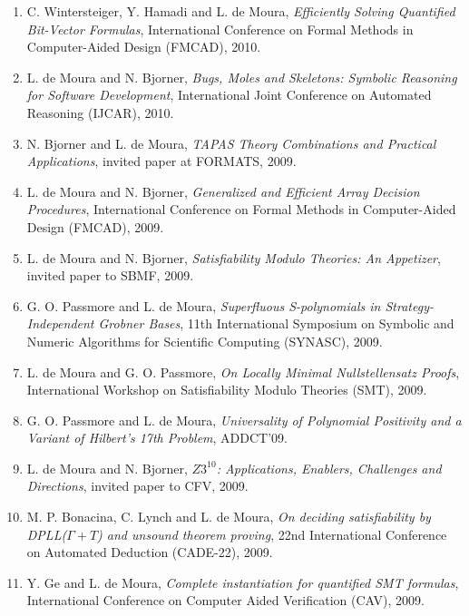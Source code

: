 \documentclass[11pt,a4paper]{article}
\begin{document}
\begin{enumerate}[leftmargin=*,itemsep=0.5ex,topsep=0.6ex]
\item C. Wintersteiger, Y. Hamadi and L. de Moura,
      {\em Efficiently Solving Quantified Bit-Vector Formulas},
      International Conference on Formal Methods in Computer-Aided Design (FMCAD), 2010.

\item L. de Moura and N. Bjorner,
      {\em Bugs, Moles and Skeletons: Symbolic Reasoning for Software Development},
      International Joint Conference on Automated Reasoning (IJCAR), 2010.

\item N. Bjorner and L. de Moura,
      {\em TAPAS Theory Combinations and Practical Applications},
      invited paper at FORMATS, 2009.

\item L. de Moura and N. Bjorner,
      {\em Generalized and Efficient Array Decision Procedures},
      International Conference on Formal Methods in Computer-Aided Design (FMCAD), 2009.

\item L. de Moura and N. Bjorner,
      {\em Satisfiability Modulo Theories: An Appetizer},
      invited paper to SBMF, 2009.

\item G. O. Passmore and L. de Moura,
      {\em Superfluous S-polynomials in Strategy-Independent Grobner Bases},
      11th International Symposium on Symbolic and Numeric Algorithms for Scientific Computing (SYNASC), 2009.

\item L. de Moura and G. O. Passmore,
      {\em On Locally Minimal Nullstellensatz Proofs},
      International Workshop on Satisfiability Modulo Theories (SMT), 2009.

\item G. O. Passmore and L. de Moura,
      {\em Universality of Polynomial Positivity and a Variant of Hilbert's 17th Problem},
      ADDCT'09.

\item L. de Moura and N. Bjorner,
      {\em $Z3^{10}$: Applications, Enablers, Challenges and Directions},
      invited paper to CFV, 2009.

\item M. P. Bonacina, C. Lynch and L. de Moura,
      {\em On deciding satisfiability by DPLL($\Gamma+T$) and unsound theorem proving},
      22nd International Conference on Automated Deduction (CADE-22), 2009.

\item Y. Ge and L. de Moura,
      {\em Complete instantiation for quantified SMT formulas},
      International Conference on Computer Aided Verification (CAV), 2009.


\end{enumerate}
\end{document}
